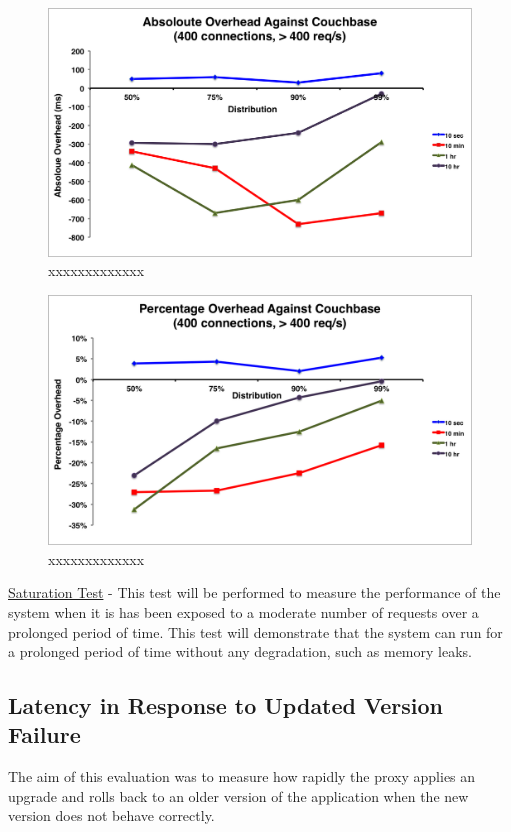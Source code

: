 \documentclass[a4paper,11pt,twoside]{report}
\begin{document}
\begin{figure}[!ht]
  \centering
     \includegraphics[scale=0.55]{absoloute-couchbase}
  \caption{xxxxxxxxxxxxx}
  \label{absoloute-couchbase}
\end{figure} 

\begin{figure}[!ht]
  \centering
     \includegraphics[scale=0.55]{percentage-couchbase}
  \caption{xxxxxxxxxxxxx}
  \label{percentage-couchbase}
\end{figure} 

\noindent
\underline{Saturation Test} - This test will be performed to measure the performance of the system when it is has been exposed to a moderate number of requests over a prolonged period of time. This test will demonstrate that the system can run for a prolonged period of time without any degradation, such as memory leaks.


\subsection{Latency in Response to Updated Version Failure}\label{Recovery}
The aim of this evaluation was to measure how rapidly the proxy applies an upgrade and rolls back to an older version of the application when the new version does not behave correctly. 
\end{document}
